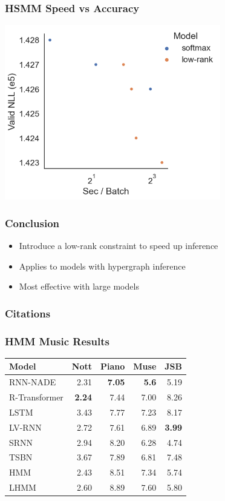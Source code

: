 \documentclass{beamer}
\begin{document}
\begin{frame}
\frametitle{HSMM Speed vs Accuracy}
\centering
\includegraphics[height=3in]{imgs/hmm/hsmm-speed-accuracy.png}
\end{frame}

\begin{frame}
\frametitle{Conclusion}
\begin{itemize}
\item Introduce a low-rank constraint to speed up inference
\vspace{2em}
\item Applies to models with hypergraph inference
\vspace{2em}
\item Most effective with large models
\end{itemize}
\end{frame}


\begin{frame}
\frametitle{Citations}
\printbibliography
\end{frame}


\begin{frame}
\frametitle{HMM Music Results}
\centering
\begin{tabular}{lrrrr}
\toprule
Model       & Nott & Piano & Muse & JSB \\
\midrule
RNN-NADE & 2.31  & \textbf{7.05}        & \textbf{5.6}        & 5.19          \\
R-Transformer & \textbf{2.24} & 7.44 & 7.00 & 8.26 \\
LSTM  & 3.43 & 7.77   & 7.23 & 8.17     \\
LV-RNN    & 2.72       & 7.61        & 6.89       &\textbf{ 3.99}\\
SRNN     & 2.94       & 8.20         & 6.28       & 4.74          \\
\midrule
TSBN     & 3.67       & 7.89        & 6.81       & 7.48          \\
HMM &  2.43 & 8.51 & 7.34 & 5.74 \\
LHMM & 2.60 & 8.89 & 7.60 & 5.80 \\
\bottomrule
\end{tabular}
\end{frame}
\end{document}
